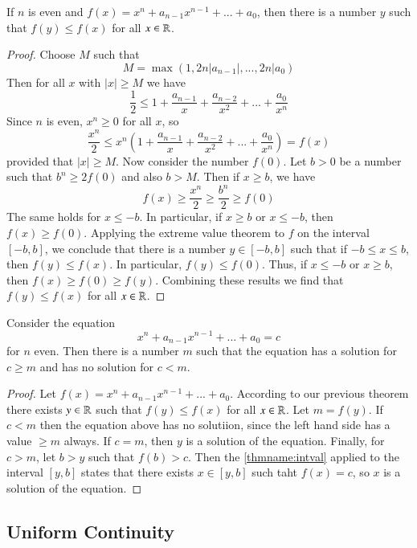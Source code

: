\begin{thm}
    If $n$ is even and $f(x) = x^n+a_{n-1}x^{n-1} + ... + a_0$, then there is a number $y$ such that $f(y) \leq f(x)$ for all $x \in \mathbb R$.
\end{thm}
\begin{proof}
    Choose $M$ such that $$M = \max(1,2n|a_{n-1}|,...,2n|a_0)$$
    Then for all $x$ with $|x| \geq M$ we have $$\frac{1}{2} \leq 1 + \frac{a_{n-1}}{x} + \frac{a_{n-2}}{x^2} + ... + \frac{a_0}{x^n}$$
    Since $n$ is even, $x^n \geq 0$ for all $x$, so $$\frac{x^n}{2} \leq x^n\left(1 + \frac{a_{n-1}}{x} + \frac{a_{n-2}}{x^2} + ... + \frac{a_0}{x^n}\right) = f(x)$$
    provided that $|x| \geq M$. Now consider the number $f(0)$. Let $b > 0$ be a number such that $b^n \geq 2f(0)$ and also $b > M$. Then if $x \geq b$, we have $$f(x) \geq \frac{x^n}{2} \geq \frac{b^n}{2} \geq f(0)$$
    The same holds for $x \leq -b$. In particular, if $x \geq b$ or $x \leq -b$, then $f(x) \geq f(0)$. Applying the extreme value theorem to $f$ on the interval $[-b,b]$, we conclude that there is a number $y \in [-b,b]$ such that if $-b \leq x \leq b$, then $f(y) \leq f(x)$. In particular, $f(y) \leq f(0)$. Thus, if $x \leq -b$ or $x \geq b$, then $f(x) \geq f(0) \geq f(y)$. Combining these results we find that $f(y) \leq f(x)$ for all $x \in \mathbb R$.
\end{proof}


\begin{cor}
    Consider the equation \begin{equation}
        x^n +a_{n-1}x^{n-1} + ... + a_0 = c
    \end{equation}
    for $n$ even. Then there is a number $m$ such that the equation has a solution for $c \geq m$ and has no solution for $c < m$.
\end{cor}
\begin{proof}
    Let $f(x) = x^n + a_{n-1}x^{n-1} + ...+ a_0$. According to our previous theorem there exists $y \in \mathbb R$ such that $f(y) \leq f(x)$ for all $x \in \mathbb R$. Let $m = f(y)$. If $c < m$ then the equation above has no solutiion, since the left hand side has a value $\geq m$ always. If $c = m$, then $y$ is a solution of the equation. Finally, for $c > m$, let $b > y$ such that $f(b) > c$. Then the \ref{thmname:intval} applied to the interval $[y,b]$ states that there exists $x \in [y,b]$ such taht $f(x) = c$, so $x$ is a solution of the equation.
\end{proof}


\subsection{Uniform Continuity}


